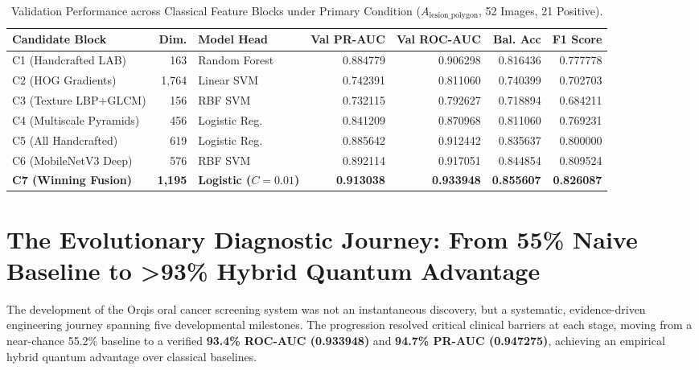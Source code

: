 \documentclass[11pt,a4paper]{report}
\begin{document}
\begin{table}[H]
\centering
\footnotesize
\setlength{\tabcolsep}{3pt}
\begin{tabularx}{\textwidth}{>{\raggedright\arraybackslash}X r >{\raggedright\arraybackslash}p{2.4cm} rrrr}
\toprule
\textbf{Candidate Block} & \textbf{Dim.} & \textbf{Model Head} & \textbf{Val PR-AUC} & \textbf{Val ROC-AUC} & \textbf{Bal. Acc} & \textbf{F1 Score} \\
\midrule
C1 (Handcrafted LAB) & 163 & Random Forest & 0.884779 & 0.906298 & 0.816436 & 0.777778 \\
C2 (HOG Gradients) & 1,764 & Linear SVM & 0.742391 & 0.811060 & 0.740399 & 0.702703 \\
C3 (Texture LBP+GLCM) & 156 & RBF SVM & 0.732115 & 0.792627 & 0.718894 & 0.684211 \\
C4 (Multiscale Pyramids) & 456 & Logistic Reg. & 0.841209 & 0.870968 & 0.811060 & 0.769231 \\
C5 (All Handcrafted) & 619 & Logistic Reg. & 0.885642 & 0.912442 & 0.835637 & 0.800000 \\
C6 (MobileNetV3 Deep) & 576 & RBF SVM & 0.892114 & 0.917051 & 0.844854 & 0.809524 \\
\midrule
\textbf{C7 (Winning Fusion)} & \textbf{1,195} & \textbf{Logistic ($C=0.01$)} & \textbf{0.913038} & \textbf{0.933948} & \textbf{0.855607} & \textbf{0.826087} \\
\bottomrule
\end{tabularx}
\caption{Validation Performance across Classical Feature Blocks under Primary Condition ($A_\text{lesion\_polygon}$, 52 Images, 21 Positive).}
\label{tab:classical_oral_val}
\end{table}

\section{The Evolutionary Diagnostic Journey: From 55\% Naive Baseline to >93\% Hybrid Quantum Advantage}
The development of the Orqis oral cancer screening system was not an instantaneous discovery, but a systematic, evidence-driven engineering journey spanning five developmental milestones. The progression resolved critical clinical barriers at each stage, moving from a near-chance 55.2\% baseline to a verified \textbf{93.4\% ROC-AUC (0.933948)} and \textbf{94.7\% PR-AUC (0.947275)}, achieving an empirical hybrid quantum advantage over classical baselines.
\end{document}
